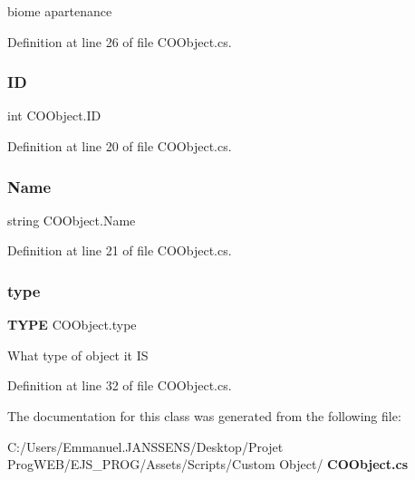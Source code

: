 biome apartenance 



Definition at line 26 of file C\+O\+Object.\+cs.

\mbox{\label{class_c_o_object_a636166b224da498736b7a7334cc27325}} 
\subsubsection{ID}
{\footnotesize\ttfamily int C\+O\+Object.\+ID}



Definition at line 20 of file C\+O\+Object.\+cs.

\mbox{\label{class_c_o_object_af91284524ceef805ab7e034d1a882503}} 
\subsubsection{Name}
{\footnotesize\ttfamily string C\+O\+Object.\+Name}



Definition at line 21 of file C\+O\+Object.\+cs.

\mbox{\label{class_c_o_object_a859e9032579029d17ff22d246f4ded27}} 
\subsubsection{type}
{\footnotesize\ttfamily \textbf{ T\+Y\+PE} C\+O\+Object.\+type}



What type of object it IS 



Definition at line 32 of file C\+O\+Object.\+cs.



The documentation for this class was generated from the following file\+:\begin{DoxyCompactItemize}
\item 
C\+:/\+Users/\+Emmanuel.\+J\+A\+N\+S\+S\+E\+N\+S/\+Desktop/\+Projet Prog\+W\+E\+B/\+E\+J\+S\+\_\+\+P\+R\+O\+G/\+Assets/\+Scripts/\+Custom Object/\textbf{ C\+O\+Object.\+cs}\end{DoxyCompactItemize}
